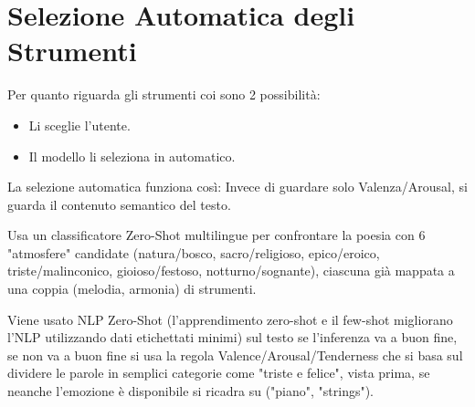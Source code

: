 \section{Selezione Automatica degli Strumenti}
Per quanto riguarda gli strumenti coi sono 2 possibilità:
\begin{itemize}
    \item Li sceglie l'utente.
    \item Il modello li seleziona in automatico.
\end{itemize}
La selezione automatica funziona così: Invece di guardare solo Valenza/Arousal, si guarda il contenuto semantico del testo.

Usa un classificatore Zero-Shot multilingue per confrontare la poesia con 6 "atmosfere" candidate (natura/bosco, sacro/religioso, epico/eroico, triste/malinconico, gioioso/festoso, notturno/sognante), ciascuna già mappata a una coppia (melodia, armonia) di strumenti.

Viene usato NLP Zero-Shot (l'apprendimento zero-shot e il few-shot migliorano l'NLP utilizzando dati etichettati minimi) sul testo se l'inferenza va a buon fine, se non va a buon fine si usa la regola Valence/Arousal/Tenderness che si basa sul dividere le parole in semplici categorie come "triste e felice", vista prima, se neanche l'emozione è disponibile si ricadra su ("piano", "strings").

